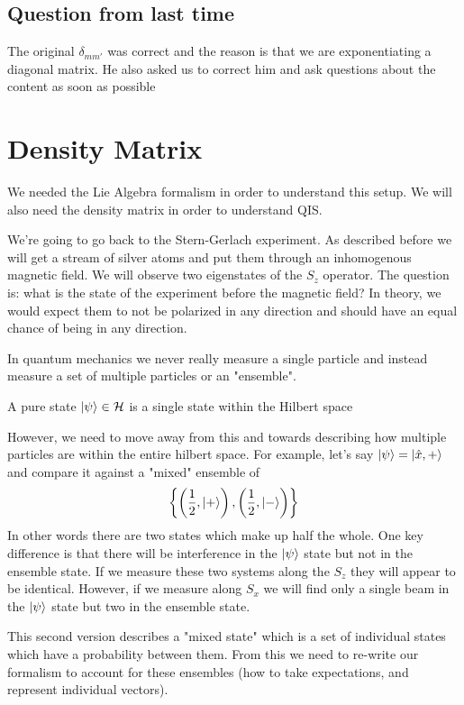 \subsection{Question from last time}
The original $\delta_{mm'}$ was correct and the reason is that we
are exponentiating a diagonal matrix. He also asked us to correct him and ask
questions about the content as soon as possible

\section{Density Matrix}
We needed the Lie Algebra formalism in order to understand
this setup. We will also need the density matrix in order to understand
QIS. 

We're going to go back to the Stern-Gerlach experiment. As described before
we will get a stream of silver atoms and put them through an inhomogenous magnetic field.
We will observe two eigenstates of the $S_z$ operator. The question is:
what is the state of the experiment before the magnetic field?
In theory, we would expect them to not be polarized in any direction and should have
an equal chance of being in any direction. 

In quantum mechanics we never really measure a single particle and instead measure
a set of multiple particles or an "ensemble". 

\begin{definition}
\label{purestate}
A pure state $\Ket{\psi} \in \mathcal{H}$ is a single state within the Hilbert space
\end{definition}

However, we need to move away from this and towards describing how multiple particles
are within the entire hilbert space. For example, let's say $\Ket{\psi} = \Ket{\hat{x}, +}$
and compare it against a "mixed" ensemble of 
$$
    \left\{\left(\frac{1}{2}, \Ket{+}\right), \left(\frac{1}{2}, \Ket{-}\right)\right\}
$$
In other words there are two states which make up half the whole. One key difference
is that there will be interference in the $\Ket{\psi}$ state but not in the
ensemble state. If we measure these two systems along the $S_z$ they will appear
to be identical. However, if we measure along $S_x$ we will find only a single
beam in the $\Ket{\psi}$ state but two in the ensemble state. 

This second version describes a "mixed state" which is a set of individual states
which have a probability between them. From this we need to re-write our formalism
to account for these ensembles (how to take expectations, and represent individual vectors).

